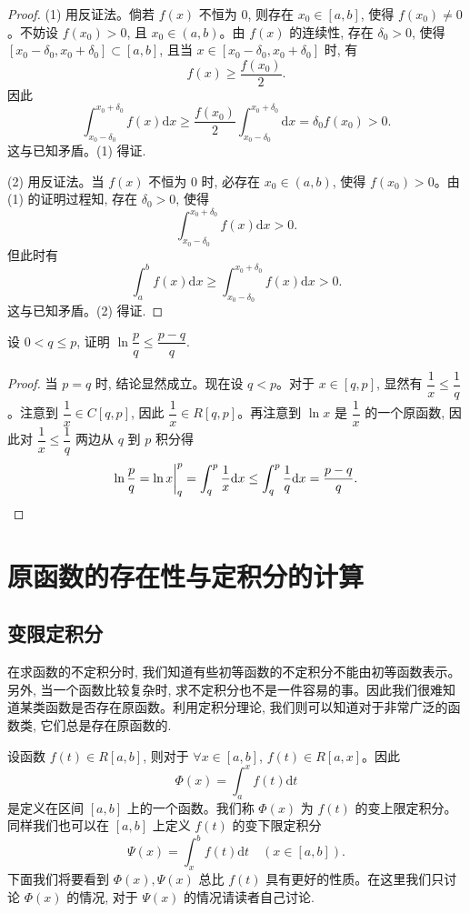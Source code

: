 \begin{proof}
(1) 用反证法。倘若 $f(x)$ 不恒为 $0$, 则存在 $x_0\in[a,b]$, 使得 $f(x_0)\neq0$。不妨设 $f(x_0)>0$, 且 $x_0\in(a,b)$。由 $f(x)$ 的连续性, 存在 $\delta_0>0$, 使得 $[x_0-\delta_0,x_0+\delta_0]\subset[a,b]$, 且当 $x\in[x_0-\delta_0,x_0+\delta_0]$ 时, 有
\[
  f(x)\geq\frac{f(x_0)}{2}.
\]
因此
\[
  \int_{x_0-\delta_0}^{x_0+\delta_0} f(x)\mathrm dx
  \geq \frac{f(x_0)}{2}\int_{x_0-\delta_0}^{x_0+\delta_0}\mathrm dx
  =\delta_0f(x_0)>0.
\]
这与已知矛盾。(1) 得证.

(2) 用反证法。当 $f(x)$ 不恒为 $0$ 时, 必存在 $x_0\in(a,b)$, 使得 $f(x_0)>0$。由 (1) 的证明过程知, 存在 $\delta_0>0$, 使得
\[
  \int_{x_0-\delta_0}^{x_0+\delta_0} f(x)\mathrm dx>0.
\]
但此时有
\[
  \int_a^b f(x)\mathrm dx\geq \int_{x_0-\delta_0}^{x_0+\delta_0} f(x)\mathrm dx>0.
\]
这与已知矛盾。(2) 得证.
\end{proof}


\begin{example}\label{example:ma-7-3-3}
设 $0<q\leq p$, 证明 $\ln\dfrac{p}{q}\leq\dfrac{p-q}{q}$.
\end{example}


\begin{proof}
当 $p=q$ 时, 结论显然成立。现在设 $q<p$。对于 $x\in[q,p]$, 显然有 $\dfrac{1}{x}\leq\dfrac{1}{q}$。注意到 $\dfrac{1}{x}\in C[q,p]$, 因此 $\dfrac{1}{x}\in R[q,p]$。再注意到 $\ln x$ 是 $\dfrac{1}{x}$ 的一个原函数, 因此对 $\dfrac{1}{x}\leq\dfrac{1}{q}$ 两边从 $q$ 到 $p$ 积分得
\[
  \ln\frac{p}{q}=\ln x\bigg|_q^p=\int_q^p\frac{1}{x}\mathrm dx
  \leq \int_q^p\frac{1}{q}\mathrm dx=\frac{p-q}{q}.
\qedhere
\]
\end{proof}


\section{原函数的存在性与定积分的计算}
\label{sec:ma-7-4}

\subsection{变限定积分}
\label{subsec:ma-7-4-1}

在求函数的不定积分时, 我们知道有些初等函数的不定积分不能由初等函数表示。另外, 当一个函数比较复杂时, 求不定积分也不是一件容易的事。因此我们很难知道某类函数是否存在原函数。利用定积分理论, 我们则可以知道对于非常广泛的函数类, 它们总是存在原函数的.

设函数 $f(t)\in R[a,b]$, 则对于 $\forall x\in[a,b]$, $f(t)\in R[a,x]$。因此
\[
  \Phi(x)=\int_a^x f(t)\mathrm dt
\]
是定义在区间 $[a,b]$ 上的一个函数。我们称 $\Phi(x)$ 为 $f(t)$ 的变上限定积分。同样我们也可以在 $[a,b]$ 上定义 $f(t)$ 的变下限定积分
\[
  \Psi(x)=\int_x^b f(t)\mathrm dt\quad(x\in[a,b]).
\]
下面我们将要看到 $\Phi(x),\Psi(x)$ 总比 $f(t)$ 具有更好的性质。在这里我们只讨论 $\Phi(x)$ 的情况, 对于 $\Psi(x)$ 的情况请读者自己讨论.

